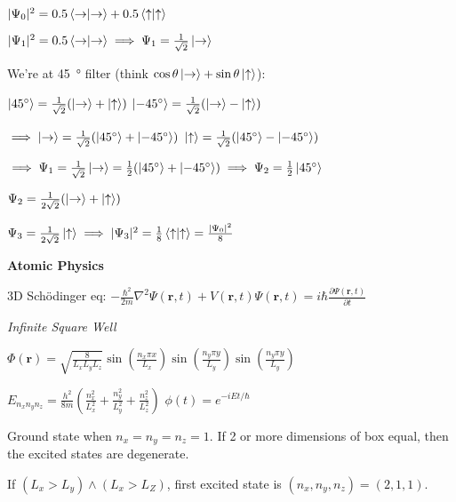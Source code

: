 \documentclass[twocolumn]{article}
\begin{document}
$|\Psi_0|^2 = 0.5 \bra{\rightarrow} \ket{\rightarrow} + 0.5 \bra{\uparrow} \ket{\uparrow}$

$|\Psi_1|^2 = 0.5 \bra{\rightarrow} \ket{\rightarrow} \implies \Psi_1 = \frac{1}{\sqrt{2}} \ket{\rightarrow}$

\newpage

We're at \SI{45}{\degree} filter (think $\cos \theta \ket{\rightarrow} + \sin \theta \ket{\uparrow}$):

$\ket{\SI{45}{\degree}} = \frac{1}{\sqrt{2}} (\ket{\rightarrow} + \ket{\uparrow})$ \hfill $\ket{\SI{-45}{\degree}} = \frac{1}{\sqrt{2}} (\ket{\rightarrow} - \ket{\uparrow})$

$\implies \ket{\rightarrow} = \frac{1}{\sqrt{2}} (\ket{\SI{45}{\degree}} + \ket{\SI{-45}{\degree}})$ \hfill $\ket{\uparrow} = \frac{1}{\sqrt{2}} (\ket{\SI{45}{\degree}} - \ket{\SI{-45}{\degree}})$

$\implies \Psi_1 = \frac{1}{\sqrt{2}} \ket{\rightarrow} = \frac{1}{2} (\ket{\SI{45}{\degree}} + \ket{\SI{-45}{\degree}}) \implies \Psi_2 = \frac{1}{2} \ket{\SI{45}{\degree}}$

$\Psi_2 = \frac{1}{2\sqrt{2}} (\ket{\rightarrow} + \ket{\uparrow})$

$\Psi_3 = \frac{1}{2\sqrt{2}} \ket{\uparrow} \implies |\Psi_3|^2 = \frac{1}{8} \bra{\uparrow} \ket{\uparrow} = \frac{|\Psi_0|^2}{8}$

\dotfill

\textbf{Atomic Physics}

3D Sch\"odinger eq: $-\frac{\hbar^2}{2m} \nabla^2 \Psi(\mathbf{r}, t) + V(\mathbf{r}, t) \Psi(\mathbf{r}, t) = i\hbar \frac{\partial \Psi(\mathbf{r}, t)}{\partial t}$

\textit{Infinite Square Well}

$\Phi(\mathbf{r}) = \sqrt{\frac{8}{L_x L_y L_z}} \sin\left(\frac{n_x\pi x}{L_x}\right) \sin\left(\frac{n_y\pi y}{L_y}\right) \sin\left(\frac{n_y\pi y}{L_y}\right)$

$E_{n_x n_y n_z} = \frac{h^2}{8m} \left( \frac{n_x^2}{L_x^2} + \frac{n_y^2}{L_y^2} + \frac{n_z^2}{L_z^2} \right)$ \hfill $\phi(t) = e^{-iEt/\hbar}$

Ground state when $n_x = n_y = n_z = 1$. If 2 or more dimensions of box equal, then the excited states are degenerate.

If $(L_x > L_y) \land (L_x > L_Z)$, first excited state is $(n_x, n_y, n_z) = (2, 1, 1)$.

\vspace{-.5em}
\dotfill
\end{document}
